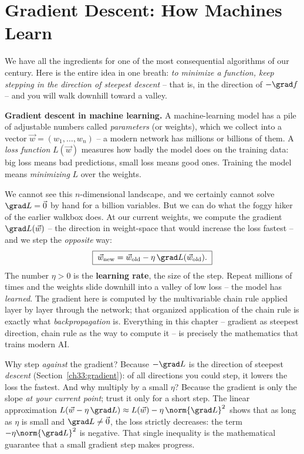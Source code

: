 \section{Gradient Descent: How Machines Learn}
\label{ch33:gd}

We have all the ingredients for one of the most consequential algorithms of our
century. Here is the entire idea in one breath: \emph{to minimize a function,
keep stepping in the direction of steepest descent} -- that is, in the direction
of $-\grad f$ -- and you will walk downhill toward a valley.

\begin{applicationbox}
\textbf{Gradient descent in machine learning.} A machine-learning model has a pile
of adjustable numbers called \emph{parameters} (or weights), which we collect into
a vector $\vec w=(w_1,\dots,w_n)$ -- a modern network has millions or billions of
them. A \emph{loss function} $L(\vec w)$ measures how badly the model does on the
training data: big loss means bad predictions, small loss means good ones.
Training the model means \emph{minimizing} $L$ over the weights.

We cannot see this $n$-dimensional landscape, and we certainly cannot solve
$\grad L = \vec 0$ by hand for a billion variables. But we can do what the foggy
hiker of the earlier walkbox does. At our current weights, we compute the gradient
$\grad L(\vec w)$ -- the direction in weight-space that would increase the loss
fastest -- and we step the \emph{opposite} way:
\[
  \boxed{\;\vec w_{\text{new}} = \vec w_{\text{old}} - \eta\,\grad L(\vec
w_{\text{old}}).\;}
\]
The number $\eta>0$ is the \textbf{learning rate}, the size of the step. Repeat
millions of times and the weights slide downhill into a valley of low loss -- the
model has \emph{learned}. The gradient here is computed by the multivariable chain
rule applied layer by layer through the network; that organized application of
the chain rule is exactly what \emph{backpropagation} is. Everything in this
chapter -- gradient as steepest direction, chain rule as the way to compute it --
is precisely the mathematics that trains modern AI.
\end{applicationbox}

\begin{intuitionbox}
Why step \emph{against} the gradient? Because $-\grad L$ is the direction of
steepest \emph{descent} (Section~\ref{ch33:gradient}): of all directions you could
step, it lowers the loss the fastest. And why multiply by a small $\eta$? Because
the gradient is only the slope \emph{at your current point}; trust it only for a
short step. The linear approximation
$L(\vec w - \eta\,\grad L)\approx L(\vec w) - \eta\,\norm{\grad L}^2$ shows that as
long as $\eta$ is small and $\grad L\neq\vec 0$, the loss strictly decreases: the
term $-\eta\norm{\grad L}^2$ is negative. That single inequality is the
mathematical guarantee that a small gradient step makes progress.
\end{intuitionbox}

